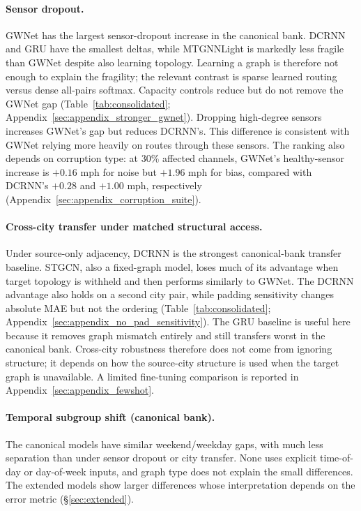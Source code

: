 \paragraph{Sensor dropout.}
GWNet has the largest sensor-dropout increase in the canonical bank. DCRNN and
GRU have the smallest deltas, while MTGNNLight is markedly less fragile than
GWNet despite also learning topology. Learning a graph is therefore not enough to explain the fragility;
the relevant contrast is sparse learned routing versus dense all-pairs softmax. Capacity controls reduce but do not remove the GWNet
gap (Table~\ref{tab:consolidated}; Appendix~\ref{sec:appendix_stronger_gwnet}).
Dropping high-degree sensors increases GWNet's gap but reduces DCRNN's. This difference is consistent with GWNet relying more heavily on routes through these sensors.
The ranking also depends on corruption type: at 30\% affected channels,
GWNet's healthy-sensor increase is $+0.16$ mph for noise but $+1.96$ mph
for bias, compared with DCRNN's $+0.28$ and $+1.00$ mph, respectively
(Appendix~\ref{sec:appendix_corruption_suite}).

\paragraph{Cross-city transfer under matched structural access.}
Under source-only adjacency, DCRNN is the strongest canonical-bank transfer
baseline. STGCN, also a fixed-graph model, loses much of its advantage when target topology is withheld and then performs similarly to GWNet. The DCRNN advantage also holds on a second
city pair, while padding sensitivity changes absolute MAE but not the ordering
(Table~\ref{tab:consolidated}; Appendix~\ref{sec:appendix_no_pad_sensitivity}).
The GRU baseline is useful here because it removes graph mismatch entirely and
still transfers worst in the canonical bank. Cross-city robustness therefore
does not come from ignoring structure; it depends on how the source-city
structure is used when the target graph is unavailable. A limited fine-tuning comparison is reported in Appendix~\ref{sec:appendix_fewshot}.

\paragraph{Temporal subgroup shift (canonical bank).}
The canonical models have similar weekend/weekday gaps, with much less separation than under sensor dropout or city transfer. None uses explicit time-of-day or day-of-week inputs, and graph type does not explain the small differences. The extended models show larger differences whose interpretation depends on the error metric (\S\ref{sec:extended}).

